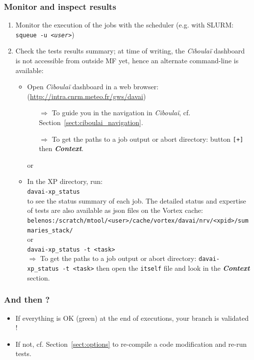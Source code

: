 \documentclass[a4paper,10pt,twoside]{article}
\begin{document}
\subsubsection{Monitor and inspect results}
\begin{enumerate}[resume,label=(\alph*)]
 \item Monitor the execution of the jobs with the scheduler (e.g. with SLURM: \texttt{squeue -u \textit{<user>}})
 \item Check the tests results summary; at time of writing, the \textit{Ciboulaï} dashboard is not accessible from outside MF yet, hence an alternate command-line is available:
 \begin{itemize}
  \item Open \textit{Ciboulaï} dashboard in a web browser: (\href{http://intra.cnrm.meteo.fr/gws/davai}{http://intra.cnrm.meteo.fr/gws/davai})
  \begin{itemize}
   \item[$\Rightarrow$] To guide you in the navigation in \textit{Ciboulaï}, cf. Section~\ref{sect:ciboulai_navigation}.
   \item[$\Rightarrow$] To get the paths to a job output or abort directory: button \texttt{[+]} then \textit{\textbf{Context}}.
  \end{itemize}
  \item[or]
  \item In the XP directory, run:\\
  \texttt{davai-xp\_status}\\
  to see the status summary of each job.
  The detailed status and expertise of tests are also available as json files on the Vortex cache:\\
 \texttt{belenos:/scratch/mtool/<user>/cache/vortex/davai/nrv/<xpid>/summaries\_stack/}\\
 or\\
 \texttt{davai-xp\_status -t <task>}\\
 $\Rightarrow$ To get the paths to a job output or abort directory: \texttt{davai-xp\_status -t <task>} then open the \texttt{itself} file and look in the \textit{\textbf{Context}} section.
 \end{itemize}
\end{enumerate}

\subsubsection*{And then ?}
\begin{itemize}
 \item If everything is OK (green) at the end of executions, your branch is validated !
 \item If not, cf. Section~\ref{sect:options} to re-compile a code modification and re-run tests.
\end{itemize}
\end{document}
